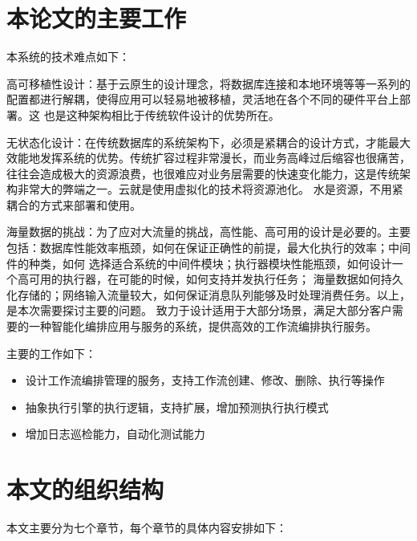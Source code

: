 %



\section{本论文的主要工作}

本系统的技术难点如下：

高可移植性设计：基于云原生的设计理念，将数据库连接和本地环境等等一系列的配置都进行解耦，使得应用可以轻易地被移植，灵活地在各个不同的硬件平台上部署。这
也是这种架构相比于传统软件设计的优势所在\cite{othe2}。

无状态化设计：在传统数据库的系统架构下，必须是紧耦合的设计方式，才能最大效能地发挥系统的优势。传统扩容过程非常漫长，而业务高峰过后缩容也很痛苦，
往往会造成极大的资源浪费，也很难应对业务层需要的快速变化能力，这是传统架构非常大的弊端之一\cite{kube2021near}。云就是使用虚拟化的技术将资源池化。
水是资源，不用紧耦合的方式来部署和使用\cite{roberson2021dbspdrp}。

海量数据的挑战：为了应对大流量的挑战，高性能、高可用的设计是必要的。主要包括：数据库性能效率瓶颈，如何在保证正确性的前提，最大化执行的效率；中间件的种类，如何
选择适合系统的中间件模块；执行器模块性能瓶颈，如何设计一个高可用的执行器，在可能的时候，如何支持并发执行任务；
海量数据如何持久化存储的；网络输入流量较大，如何保证消息队列能够及时处理消费任务。以上，是本次需要探讨主要的问题。
致力于设计适用于大部分场景，满足大部分客户需要的一种智能化编排应用与服务的系统，提供高效的工作流编排执行服务。

主要的工作如下：
\begin{itemize}
    \item 设计工作流编排管理的服务，支持工作流创建、修改、删除、执行等操作
    \item 抽象执行引擎的执行逻辑，支持扩展，增加预测执行执行模式
    \item 增加日志巡检能力，自动化测试能力
\end{itemize}

\section{本文的组织结构}
本文主要分为七个章节，每个章节的具体内容安排如下：

